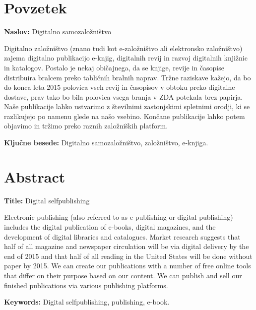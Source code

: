 \documentclass[a4paper, 12pt]{book}
\newcommand{\tkeywords}{Digitalno samozaložništvo, založništvo, e-knjiga}
\newcommand{\tkeywordsEn}{Digital selfpublishing, publishing, e-book}
\newcommand{\clearemptydoublepage}{\newpage{\pagestyle{empty}\cleardoublepage}}
\begin{document}
\clearemptydoublepage

\chapter*{Povzetek}

\noindent\textbf{Naslov:} Digitalno samozaložništvo
\bigskip

\noindent Digitalno založništvo (znano tudi kot e-založništvo ali elektronsko založništvo) zajema digitalno publikacijo e-knjig, digitalnih revij in razvoj digitalnih knjižnic in katalogov. Postalo je nekaj običajnega, da se knjige, revije in časopise distribuira bralcem preko tabličnih bralnih naprav. Tržne raziskave kažejo, da bo do konca leta 2015 polovica vseh revij in časopisov v obtoku preko digitalne dostave, prav tako bo bila polovica vsega branja v ZDA potekala brez papirja. Naše publikacije lahko ustvarimo z številnimi zastonjskimi spletnimi orodji, ki se razlikujejo po namenu glede na našo vsebino. Končane publikacije lahko potem objavimo in tržimo preko raznih založniških platform.
\bigskip

\noindent\textbf{Ključne besede:} \tkeywords.
\clearemptydoublepage

\chapter*{Abstract}

\noindent\textbf{Title:} Digital selfpublishing
\bigskip

\noindent Electronic publishing (also referred to as e-publishing or digital publishing) includes the digital publication of e-books, digital magazines, and the development of digital libraries and catalogues. Market research suggests that half of all magazine and newspaper circulation will be via digital delivery by the end of 2015 and that half of all reading in the United States will be done without paper by 2015. We can create our publications with a number of free online tools that differ on their purpose based on our content. We can publish and sell our finished publications via various publishing platforms.
\bigskip

\noindent\textbf{Keywords:} \tkeywordsEn.
\clearemptydoublepage
\end{document}
